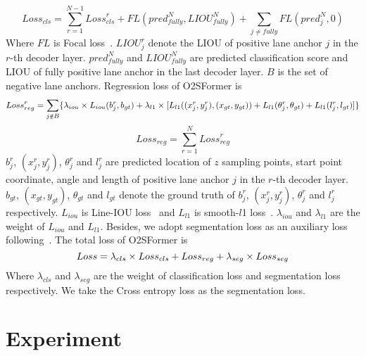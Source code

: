 \documentclass{bmvc2k}
\begin{document}
 \vspace{-0.5cm}
 \begin{equation}\label{eqn-11} 
   {Loss}_{cls}=\sum_{r=1}^{N-1}{Loss}_{cls}^r+FL(pred_{fully}^N,LIOU_{fully}^N)+\sum_{j\neq fully}{FL(pred_j^N,0)}
 \end{equation}
 Where $FL$ is Focal loss~\cite{lin2017focal}. $LIOU_{j}^r$ denote the LIOU of positive lane anchor $j$ in the $r$-th decoder layer.  
 $pred_{fully}^N$ and $LIOU_{fully}^N$ are predicted classification score and LIOU of fully positive lane anchor in the last decoder layer. $B$ is the set of negative lane anchors. Regression loss of O2SFormer is
 \vspace{-0.15cm}
 \begin{equation}\label{eqn-12} 
   \small
   {Loss}_{reg}^r=\sum_{j\notin B} \{{\lambda_{iou}\times {L}_{iou}(b_j^r,b_{gt})+\lambda_{l1}\times [{L}_{l1}((x_j^r,y_j^r),(x_{gt},y_{gt}))+{L}_{l1}(\theta_j^r,\theta_{gt})+{L}_{l1}(l_j^r,l_{gt})]}\}
   \vspace{-0.32cm}
 \end{equation}
 \vspace{-0.2cm}
 \begin{equation}\label{eqn-13} 
   {Loss}_{reg}=\sum_{r=1}^{N}{Loss}_{reg}^r  
 \end{equation}
 $b_j^r$, $(x_j^r,y_j^r)$, $\theta_j^r$ and $l_j^r$ are predicted location of $z$ sampling points, start point coordinate, 
 angle and length of positive lane anchor $j$ in the $r$-th decoder layer. $b_{gt}$, $(x_{gt},y_{gt})$, $\theta_{gt}$ and $l_{gt}$ denote the ground truth of $b_j^r$, $(x_j^r,y_j^r)$, $\theta_j^r$ and $l_j^r$ respectively. 
 $L_{iou}$ is Line-IOU loss~\cite{zheng2022clrnet} and $L_{l1}$ is smooth-$l$1 loss~\cite{girshick2015fast}. $\lambda_{iou}$ and $\lambda_{l1}$ are the weight of $L_{iou}$ and $L_{l1}$.
 Besides, we adopt segmentation loss as an auxiliary loss following~\cite{zheng2022clrnet}. The total loss of O2SFormer is
 \vspace{-0.2cm}
 \begin{equation}\label{eqn-14} 
   Loss=\lambda_{cls}\times{Loss}_{cls}+{Loss}_{reg}+\lambda_{seg}\times{Loss}_{seg} 
   \vspace{-0.15cm}
 \end{equation}
 Where $\lambda_{cls}$ and $\lambda_{seg}$ are the weight of classification loss and segmentation loss respectively. 
 We take the Cross entropy loss as the segmentation loss.
 \vspace{-0.35cm}
 \section{Experiment}
\end{document}
